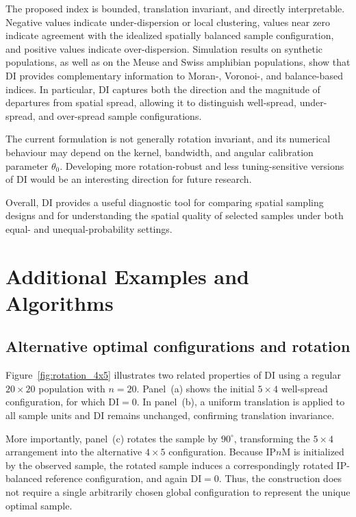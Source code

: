 \documentclass[12pt]{imsart}
\theoremstyle{plain}
\theoremstyle{remark}
\begin{document}
The proposed index is bounded, translation invariant, and directly
interpretable. Negative values indicate under-dispersion or local clustering,
values near zero indicate agreement with the idealized spatially balanced sample configuration, and
positive values indicate over-dispersion. Simulation results on synthetic populations, as well as on the Meuse and Swiss
amphibian populations, show that DI provides complementary information to Moran-, Voronoi-, and
balance-based indices. In particular, DI captures both the direction and the
magnitude of departures from spatial spread, allowing it to distinguish
well-spread, under-spread, and over-spread sample configurations.

The current formulation is not generally rotation invariant,
and its numerical behaviour may depend on the kernel, bandwidth, and angular
calibration parameter \(\theta_0\). Developing more rotation-robust and less
tuning-sensitive versions of DI would be an interesting direction for future
research.

Overall, DI provides a useful diagnostic tool for comparing spatial sampling
designs and for understanding the spatial quality of selected samples under
both equal- and unequal-probability settings.

\clearpage
\appendix
\section{Additional Examples and Algorithms}

\subsection{Alternative optimal configurations and rotation}
\label{Exm:rotation_4x5}


Figure~\ref{fig:rotation_4x5} illustrates two related properties of DI using a
regular \(20\times20\) population with \(n=20\). Panel~(a) shows the initial
\(5\times4\) well-spread configuration, for which \(\mathrm{DI}=0\).
In panel~(b), a uniform translation is applied to all sample units and DI
remains unchanged, confirming translation invariance.

More importantly, panel~(c) rotates the sample by \(90^\circ\), transforming
the \(5\times4\) arrangement into the alternative \(4\times5\) configuration.
Because IP\(n\)M is initialized by the observed sample, the rotated sample
induces a correspondingly rotated IP-balanced reference configuration, and
again \(\mathrm{DI}=0\). Thus, the construction does not require a single
arbitrarily chosen global configuration to represent the unique optimal
sample.
\end{document}
